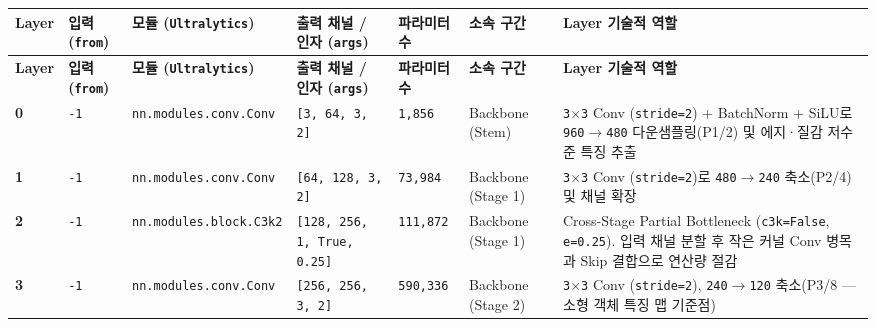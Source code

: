 \documentclass[10.5pt,a4paper]{article}
\begin{document}
\begin{footnotesize}
\setlength{\tabcolsep}{4pt}
\setlength{\LTleft}{0pt}\setlength{\LTright}{0pt}
\begin{longtable}{>{\raggedright\arraybackslash}p{} >{\raggedright\arraybackslash}p{} >{\raggedright\arraybackslash}p{} >{\raggedright\arraybackslash}p{} >{\raggedright\arraybackslash}p{} >{\raggedright\arraybackslash}p{} >{\raggedright\arraybackslash}p{}}
\toprule
\textbf{Layer} & \textbf{입력(\texttt{from})} & \textbf{모듈 (\texttt{Ultralytics})} & \textbf{출력 채널 / 인자 (\texttt{args})} & \textbf{파라미터 수} & \textbf{소속 구간} & \textbf{Layer 기술적 역할} \\
\midrule
\endfirsthead
\toprule
\textbf{Layer} & \textbf{입력(\texttt{from})} & \textbf{모듈 (\texttt{Ultralytics})} & \textbf{출력 채널 / 인자 (\texttt{args})} & \textbf{파라미터 수} & \textbf{소속 구간} & \textbf{Layer 기술적 역할} \\
\midrule
\endhead
\bottomrule
\endfoot
\textbf{0} & \texttt{-\allowbreak{}1} & \texttt{nn.\allowbreak{}modules.\allowbreak{}conv.\allowbreak{}Conv} & \texttt{[3,\allowbreak{} 64,\allowbreak{} 3,\allowbreak{} 2]} & \texttt{1,\allowbreak{}856} & Backbone (Stem) & \texttt{3$\times$3} Conv (\texttt{stride=2}) + BatchNorm + SiLU로 \texttt{960$\rightarrow$480} 다운샘플링(P1/2) 및 에지·질감 저수준 특징 추출 \\
\textbf{1} & \texttt{-\allowbreak{}1} & \texttt{nn.\allowbreak{}modules.\allowbreak{}conv.\allowbreak{}Conv} & \texttt{[64,\allowbreak{} 128,\allowbreak{} 3,\allowbreak{} 2]} & \texttt{73,\allowbreak{}984} & Backbone (Stage 1) & \texttt{3$\times$3} Conv (\texttt{stride=2})로 \texttt{480$\rightarrow$240} 축소(P2/4) 및 채널 확장 \\
\textbf{2} & \texttt{-\allowbreak{}1} & \texttt{nn.\allowbreak{}modules.\allowbreak{}block.\allowbreak{}C3k2} & \texttt{[128,\allowbreak{} 256,\allowbreak{} 1,\allowbreak{} True,\allowbreak{} 0.\allowbreak{}25]} & \texttt{111,\allowbreak{}872} & Backbone (Stage 1) & Cross-Stage Partial Bottleneck (\texttt{c3k=False}, \texttt{e=0.\allowbreak{}25}). 입력 채널 분할 후 작은 커널 Conv 병목과 Skip 결합으로 연산량 절감 \\
\textbf{3} & \texttt{-\allowbreak{}1} & \texttt{nn.\allowbreak{}modules.\allowbreak{}conv.\allowbreak{}Conv} & \texttt{[256,\allowbreak{} 256,\allowbreak{} 3,\allowbreak{} 2]} & \texttt{590,\allowbreak{}336} & Backbone (Stage 2) & \texttt{3$\times$3} Conv (\texttt{stride=2}), \texttt{240$\rightarrow$120} 축소(P3/8 --- 소형 객체 특징 맵 기준점) \\

\end{longtable}
\end{footnotesize}
\end{document}
